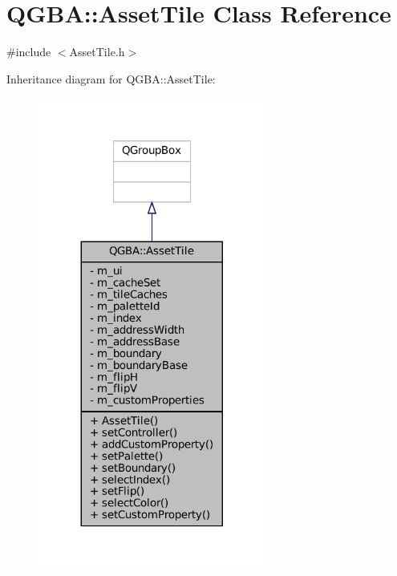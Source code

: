 \hypertarget{class_q_g_b_a_1_1_asset_tile}{}\section{Q\+G\+BA\+:\+:Asset\+Tile Class Reference}
\label{class_q_g_b_a_1_1_asset_tile}


{\ttfamily \#include $<$Asset\+Tile.\+h$>$}



Inheritance diagram for Q\+G\+BA\+:\+:Asset\+Tile\+:
\nopagebreak
\begin{figure}[H]
\begin{center}
\leavevmode
\includegraphics[width=212pt]{class_q_g_b_a_1_1_asset_tile__inherit__graph}
\end{center}
\end{figure}


